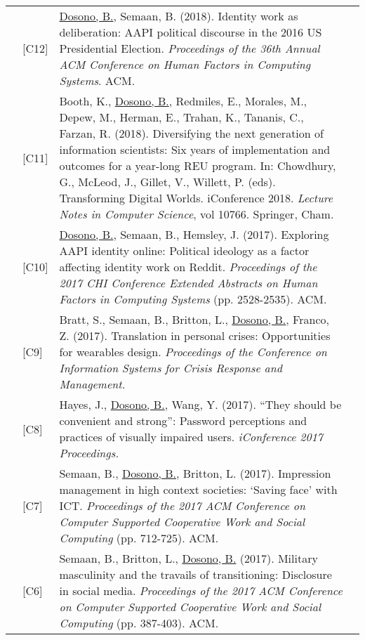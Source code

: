 \documentclass[12pt]{article}
\begin{document}
{{\begin{longtable}{Rp{1.0in}p{0.25in}p{4.75in}}
& \footnotesize{[C12]} & \href{https://dl.acm.org/authorize?N658208}{{Dosono, B.}}, Semaan, B. (2018). Identity work as deliberation: AAPI political discourse in the 2016 US Presidential Election. \textit{Proceedings of the 36th Annual ACM Conference on Human Factors in Computing Systems}. ACM. \\

& \footnotesize{[C11]} & Booth, K., \href{https://doi.org/10.1007/978-3-319-78105-1_75}{ {Dosono, B.}}, Redmiles, E., Morales, M., Depew, M., Herman, E., Trahan, K., Tananis, C., Farzan, R. (2018). Diversifying the next generation of information scientists: Six years of implementation and outcomes for a year-long REU program. In: Chowdhury, G., McLeod, J., Gillet, V., Willett, P. (eds). Transforming Digital Worlds. iConference 2018. \textit{Lecture Notes in Computer Science}, vol 10766. Springer, Cham. \\

& \footnotesize{[C10]} & \href{http://dl.acm.org/authorize?N41342}{{Dosono, B.}}, Semaan, B., Hemsley, J. (2017). Exploring AAPI identity online: Political ideology as a factor affecting identity work on Reddit. \textit{Proceedings of the 2017 CHI Conference Extended Abstracts on Human Factors in Computing Systems }(pp. 2528-2535). ACM. \\

& \footnotesize{[C9]} & Bratt, S., Semaan, B., Britton, L., \href{http://idl.iscram.org/files/sarahbratt/2017/1463\_SarahBratt\_etal2017.pdf}{{Dosono, B.}}, Franco, Z. (2017). Translation in personal crises: Opportunities for wearables design. \textit{Proceedings of the Conference on Information Systems for Crisis Response and Management.} \\

& \footnotesize{[C8]} & Hayes, J., \href{https://doi.org/10.9776/17215}{{Dosono, B.}}, Wang, Y. (2017). ``They should be convenient and strong'': Password perceptions and practices of visually impaired users. \textit{iConference 2017 Proceedings.} \\

& \footnotesize{[C7]} & Semaan, B., \href{http://dl.acm.org/authorize?N41343}{{Dosono, B.}}, Britton, L. (2017). Impression management in high context societies: ‘Saving face’ with ICT. \textit{Proceedings of the 2017 ACM Conference on Computer Supported Cooperative Work and Social Computing} (pp. 712-725). ACM. \\

& \footnotesize{[C6]} & Semaan, B., Britton, L., \href{http://dl.acm.org/authorize?N41344}{{Dosono, B.}} (2017). Military masculinity and the travails of transitioning: Disclosure in social media. \textit{Proceedings of the 2017 ACM Conference on Computer Supported Cooperative Work and Social Computing} (pp. 387-403). ACM. \\


\end{longtable}}}
\end{document}

